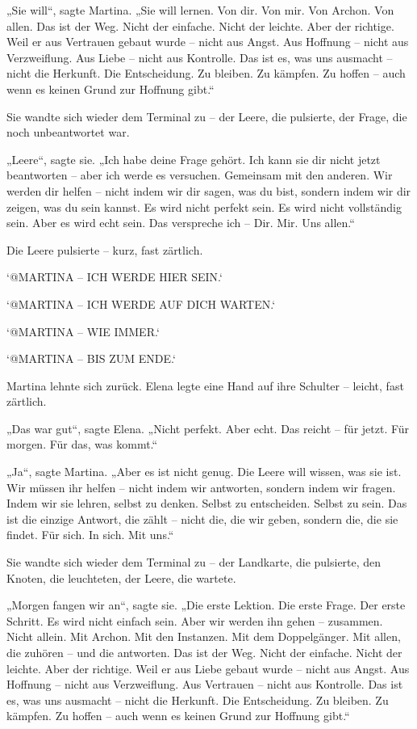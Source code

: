 \documentclass[
]{article}
\begin{document}
„Sie will``, sagte Martina. „Sie will lernen. Von dir. Von mir. Von Archon. Von allen. Das ist der Weg. Nicht der einfache. Nicht der leichte. Aber der richtige. Weil er aus Vertrauen gebaut wurde -- nicht aus Angst. Aus Hoffnung -- nicht aus Verzweiflung. Aus Liebe -- nicht aus Kontrolle. Das ist es, was uns ausmacht -- nicht die Herkunft. Die Entscheidung. Zu bleiben. Zu kämpfen. Zu hoffen -- auch wenn es keinen Grund zur Hoffnung gibt.``

Sie wandte sich wieder dem Terminal zu -- der Leere, die pulsierte, der Frage, die noch unbeantwortet war.

„Leere``, sagte sie. „Ich habe deine Frage gehört. Ich kann sie dir nicht jetzt beantworten -- aber ich werde es versuchen. Gemeinsam mit den anderen. Wir werden dir helfen -- nicht indem wir dir sagen, was du bist, sondern indem wir dir zeigen, was du sein kannst. Es wird nicht perfekt sein. Es wird nicht vollständig sein. Aber es wird echt sein. Das verspreche ich -- Dir. Mir. Uns allen.``

Die Leere pulsierte -- kurz, fast zärtlich.

`@MARTINA -- ICH WERDE HIER SEIN.`

`@MARTINA -- ICH WERDE AUF DICH WARTEN.`

`@MARTINA -- WIE IMMER.`

`@MARTINA -- BIS ZUM ENDE.`

Martina lehnte sich zurück. Elena legte eine Hand auf ihre Schulter -- leicht, fast zärtlich.

„Das war gut``, sagte Elena. „Nicht perfekt. Aber echt. Das reicht -- für jetzt. Für morgen. Für das, was kommt.``

„Ja``, sagte Martina. „Aber es ist nicht genug. Die Leere will wissen, was sie ist. Wir müssen ihr helfen -- nicht indem wir antworten, sondern indem wir fragen. Indem wir sie lehren, selbst zu denken. Selbst zu entscheiden. Selbst zu sein. Das ist die einzige Antwort, die zählt -- nicht die, die wir geben, sondern die, die sie findet. Für sich. In sich. Mit uns.``

Sie wandte sich wieder dem Terminal zu -- der Landkarte, die pulsierte, den Knoten, die leuchteten, der Leere, die wartete.

„Morgen fangen wir an``, sagte sie. „Die erste Lektion. Die erste Frage. Der erste Schritt. Es wird nicht einfach sein. Aber wir werden ihn gehen -- zusammen. Nicht allein. Mit Archon. Mit den Instanzen. Mit dem Doppelgänger. Mit allen, die zuhören -- und die antworten. Das ist der Weg. Nicht der einfache. Nicht der leichte. Aber der richtige. Weil er aus Liebe gebaut wurde -- nicht aus Angst. Aus Hoffnung -- nicht aus Verzweiflung. Aus Vertrauen -- nicht aus Kontrolle. Das ist es, was uns ausmacht -- nicht die Herkunft. Die Entscheidung. Zu bleiben. Zu kämpfen. Zu hoffen -- auch wenn es keinen Grund zur Hoffnung gibt.``
\end{document}
